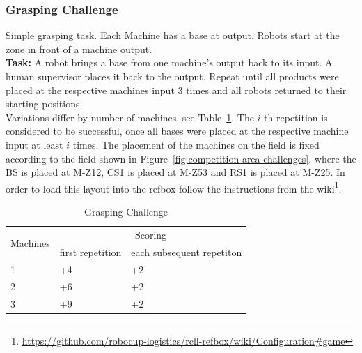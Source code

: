 \documentclass[12pt,twoside]{article}
\newcommand{\reffig}[1]{Figure~\ref{#1}}
\newcommand{\reftab}[1]{Table~\ref{#1}}
\begin{document}
\subsubsection{Grasping Challenge}\label{sec:challenge-grasping}
Simple grasping task.
Each Machine has a base at output.
Robots start at the zone in front of a machine output.\\
\textbf{Task:} A robot brings a base from one machine's output back to its
input. A human supervisor places it back to the output. Repeat until all
products were placed at the respective machines input 3 times and all robots
returned to their starting positions. \\
Variations differ by number of machines, see
\reftab{tab:challenge-grasping}. The $i$-th repetition is considered to be
successful, once all bases were placed at the respective machine input
at least $i$ times.
The placement of the machines on the field is fixed according to the field
shown in \reffig{fig:competition-area-challenges}, where the \ac{BS} is
placed at M-Z12, CS1 is placed at M-Z53 and \ac{RS}1 is placed at M-Z25.
In order to load this layout into the \ac{refbox} follow the instructions
from the
wiki\footnote{\url{https://github.com/robocup-logistics/rcll-refbox/wiki/Configuration\#game}}. %

\begin{table}[!htb]
\centering
 \begin{tabular}{l|l|l}
  \multirow{2}{*}{Machines}
  & \multicolumn{2}{c}{Scoring} \\\cline{2-3}
  & first repetition
  & each subsequent repetiton  \\\hline\hline
  1 & +4 & +2 \\
  2 & +6 & +2 \\
  3 & +9 & +2 \\
 \end{tabular}
 \caption{Grasping Challenge}
 \label{tab:challenge-grasping}
\end{table}
\end{document}
